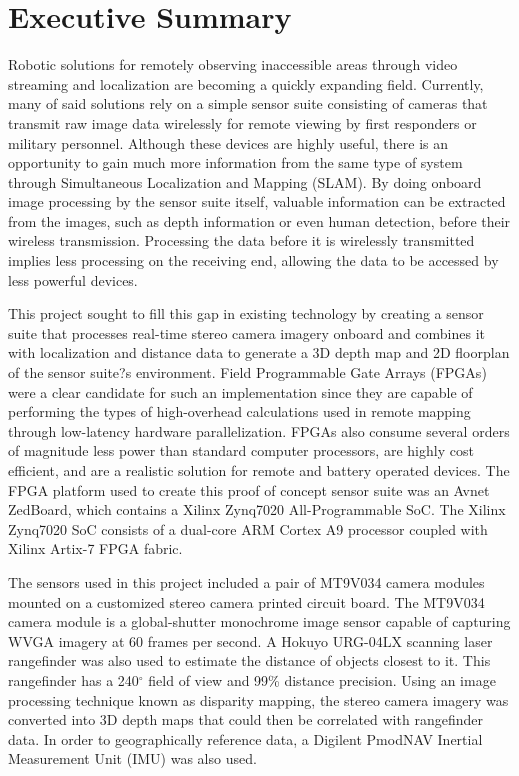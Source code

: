 {}
\section*{Executive Summary}

Robotic solutions for remotely observing inaccessible areas through video streaming and localization are becoming a quickly expanding field. Currently, many of said solutions rely on a simple sensor suite consisting of cameras that transmit raw image data wirelessly for remote viewing by first responders or military personnel. Although these devices are highly useful, there is an opportunity to gain much more information from the same type of system through Simultaneous Localization and Mapping (SLAM). By doing onboard image processing by the sensor suite itself, valuable information can be extracted from the images, such as depth information or even human detection, before their wireless transmission. Processing the data before it is wirelessly transmitted implies less processing on the receiving end, allowing the data to be accessed by less powerful devices.
\par
This project sought to fill this gap in existing technology by creating a sensor suite that processes real-time stereo camera imagery onboard and combines it with localization and distance data to generate a 3D depth map and 2D floorplan of the sensor suite?s environment. Field Programmable Gate Arrays (FPGAs) were a clear candidate for such an implementation since they are capable of performing the types of high-overhead calculations used in remote mapping through low-latency hardware parallelization. FPGAs also consume several orders of magnitude less power than standard computer processors, are highly cost efficient, and are a realistic solution for remote and battery operated devices. The FPGA platform used to create this proof of concept sensor suite was an Avnet ZedBoard, which contains a Xilinx Zynq7020 All-Programmable SoC. The Xilinx Zynq7020 SoC consists of a dual-core ARM Cortex A9 processor coupled with Xilinx Artix-7 FPGA fabric.
\par
The sensors used in this project included a pair of MT9V034 camera modules mounted on a customized stereo camera printed circuit board. The MT9V034 camera module is a global-shutter monochrome image sensor capable of capturing WVGA imagery at 60 frames per second. A Hokuyo URG-04LX scanning laser rangefinder was also used to estimate the distance of objects closest to it. This rangefinder has a 240$^\circ$ field of view and 99\% distance precision. Using an image processing technique known as disparity mapping, the stereo camera imagery was converted into 3D depth maps that could then be correlated with rangefinder data. In order to geographically reference data, a Digilent PmodNAV Inertial Measurement Unit (IMU) was also used. 

